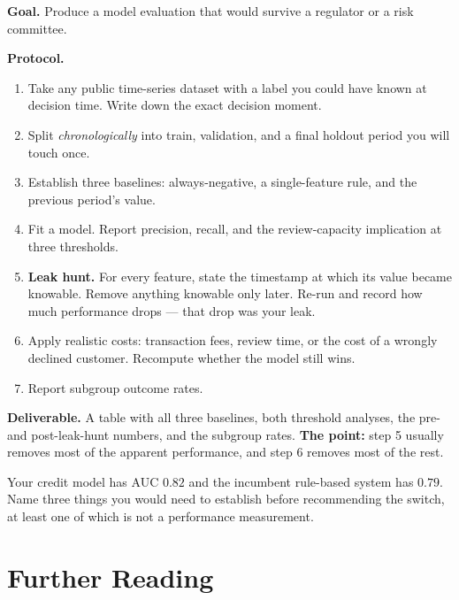 \begin{practicallab}
\textbf{Goal.} Produce a model evaluation that would survive a regulator or a
risk committee.

\textbf{Protocol.}
\begin{enumerate}
  \item Take any public time-series dataset with a label you could have known
        at decision time. Write down the exact decision moment.
  \item Split \emph{chronologically} into train, validation, and a final
        holdout period you will touch once.
  \item Establish three baselines: always-negative, a single-feature rule, and
        the previous period's value.
  \item Fit a model. Report precision, recall, and the review-capacity
        implication at three thresholds.
  \item \textbf{Leak hunt.} For every feature, state the timestamp at which its
        value became knowable. Remove anything knowable only later. Re-run and
        record how much performance drops --- that drop was your leak.
  \item Apply realistic costs: transaction fees, review time, or the cost of a
        wrongly declined customer. Recompute whether the model still wins.
  \item Report subgroup outcome rates.
\end{enumerate}

\textbf{Deliverable.} A table with all three baselines, both threshold
analyses, the pre- and post-leak-hunt numbers, and the subgroup rates.
\textbf{The point:} step 5 usually removes most of the apparent performance,
and step 6 removes most of the rest.
\end{practicallab}

\begin{checkpoint}
Your credit model has AUC $0.82$ and the incumbent rule-based system has
$0.79$. Name three things you would need to establish before recommending the
switch, at least one of which is not a performance measurement.
\end{checkpoint}


\section{Further Reading}

